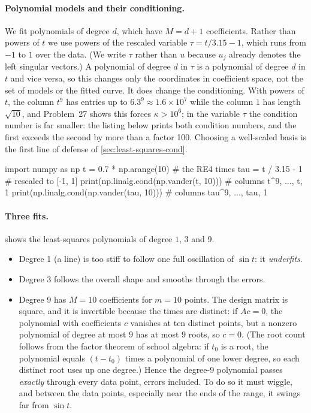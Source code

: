 \paragraph{Polynomial models and their conditioning.} We fit polynomials of degree $d$, which have $M = d+1$ coefficients. Rather than powers of $t$ we use powers of the rescaled variable $\tau = t/3.15 - 1$, which runs from $-1$ to $1$ over the data. (We write $\tau$ rather than $u$ because $u_j$ already denotes the left singular vectors.) A polynomial of degree $d$ in $\tau$ is a polynomial of degree $d$ in $t$ and vice versa, so this changes only the coordinates in coefficient space, not the set of models or the fitted curve. It does change the conditioning. With powers of $t$, the column $t^9$ has entries up to $6.3^9\approx1.6\times10^7$ while the column $1$ has length $\sqrt{10}$, and Problem~27 shows this forces $\kappa > 10^6$; in the variable $\tau$ the condition number is far smaller: the listing below prints both condition numbers, and the first exceeds the second by more than a factor 100. Choosing a well-scaled basis is the first line of defense of \cref{sec:least-squares-cond}.

\begin{pycode}
import numpy as np
t = 0.7 * np.arange(10)          # the RE4 times
tau = t / 3.15 - 1                 # rescaled to [-1, 1]
print(np.linalg.cond(np.vander(t, 10)))   # columns t^9, ..., t, 1
print(np.linalg.cond(np.vander(tau, 10)))   # columns tau^9, ..., tau, 1
\end{pycode}

\paragraph{Three fits.}  shows the least-squares polynomials of degree $1$, $3$ and $9$.
\begin{itemize}
\item Degree 1 (a line) is too stiff to follow one full oscillation of $\sin t$: it \emph{underfits}.
\item Degree 3 follows the overall shape and smooths through the errors.
\item Degree 9 has $M=10$ coefficients for $m = 10$ points. The design matrix is square, and it is invertible because the times are distinct: if $Ac = 0$, the polynomial with coefficients $c$ vanishes at ten distinct points, but a nonzero polynomial of degree at most $9$ has at most $9$ roots, so $c = 0$. (The root count follows from the factor theorem of school algebra: if $t_0$ is a root, the polynomial equals $(t-t_0)$ times a polynomial of one lower degree, so each distinct root uses up one degree.) Hence the degree-9 polynomial passes \emph{exactly} through every data point, errors included. To do so it must wiggle, and between the data points, especially near the ends of the range, it swings far from $\sin t$.
\end{itemize}

